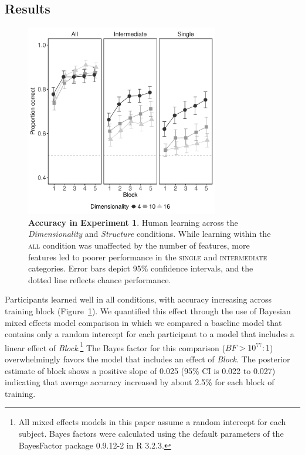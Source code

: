 \documentclass[a4paper, doc, floatsintext]{apa6}
\begin{document}
\subsection{Results}

\begin{figure}[t]
  \begin{center}
    \includegraphics[width=0.75\textwidth]{figures/mean-performance-experiment-one.pdf}
    \caption{\small{\textbf{Accuracy in Experiment 1}. Human learning across the \textit{Dimensionality} and \textit{Structure} conditions. While learning within the \textsc{all} condition was unaffected by the number of features, more features led to poorer performance in the \textsc{single} and \textsc{intermediate} categories. Error bars depict 95\% confidence intervals, and the dotted line reflects chance performance.}}
    \label{mean-performance-experiment-one}
  \end{center}
      \vspace{-5mm}
\end{figure}

Participants learned well in all conditions, with accuracy increasing across training block (Figure~\ref{mean-performance-experiment-one}). We quantified this effect through the use of Bayesian mixed effects model comparison in which we compared a baseline model that contains only a random intercept for each participant to a model that includes a linear effect of \textit{Block}.\footnote{All mixed effects models in this paper assume a random intercept for each subject. Bayes factors were calculated using the default parameters \cite{rouder2012default,liang2012mixtures} of the BayesFactor package 0.9.12-2 \cite{bayesfactor} in R 3.2.3.} The Bayes factor for this comparison ($BF > 10^{77} : 1$) overwhelmingly favors the model that includes an effect of \textit{Block}. The posterior estimate of block shows a positive slope of 0.025 (95\% CI is 0.022 to 0.027) indicating that average accuracy increased by about 2.5\% for each block of training.
\end{document}
